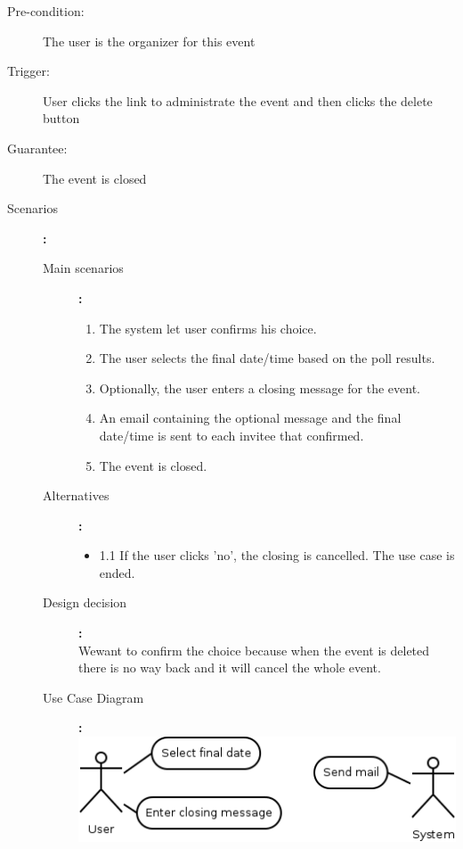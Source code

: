 \begin{description}
	\item[Pre-condition:] The user is the organizer for this event
	\item[Trigger:] User clicks the link to administrate the event and then clicks the delete button
	\item[Guarantee:] The event is closed
	\item[Scenarios]\textbf{:}\\
				\begin{description}
					\item[Main scenarios]\textbf{:}\\
								\begin{enumerate}
									\item The system let user confirms his choice.
									\item The user selects the final date/time based on the poll results.
									\item Optionally, the user enters a closing message for the event.
									\item An email containing the optional message and the final date/time is sent to each invitee that confirmed.
									\item The event is closed.
								\end{enumerate}
					\item[Alternatives]\textbf{:}\\
								\begin{itemize}
									\item 1.1 If the user clicks 'no', the closing is cancelled. The use case is ended.
								\end{itemize}
					\item[Design decision]\textbf{:}\\Wewant to confirm the choice because when the event is deleted there is no way back and it will cancel the whole event.
					\item[Use Case Diagram]\textbf{:}\\
						\includegraphics[scale=0.5]{ucd/Diagram4.png}
				\end{description}
\end{description}

